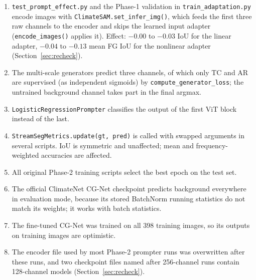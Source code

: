 \begin{enumerate}
  \item \texttt{test\_prompt\_effect.py} and the Phase-1 validation in \texttt{train\_adaptation.py} encode images with
  \texttt{ClimateSAM.set\_infer\_img()}, which feeds the first three raw channels to the encoder and skips the learned
  input adapter (\texttt{encode\_images()} applies it). Effect: $-0.00$ to $-0.03$ IoU for the linear adapter,
  $-0.04$ to $-0.13$ mean FG IoU for the nonlinear adapter (Section~\ref{sec:recheck}).
  \item The multi-scale generators predict three channels, of which only TC and AR are supervised (as independent
  sigmoids) by \texttt{compute\_\allowbreak generator\_\allowbreak loss}; the untrained background channel takes part in the final argmax.
  \item \texttt{LogisticRegressionPrompter} classifies the output of the first ViT block instead of the last.
  \item \texttt{StreamSegMetrics.\allowbreak update(gt, pred)} is called with swapped arguments in several scripts. IoU is
  symmetric and unaffected; mean and frequency-weighted accuracies are affected.
  \item All original Phase-2 training scripts select the best epoch on the test set.
  \item The official ClimateNet CG-Net checkpoint predicts background everywhere in evaluation mode, because its stored
  BatchNorm running statistics do not match its weights; it works with batch statistics.
  \item The fine-tuned CG-Net was trained on all 398 training images, so its outputs on training images are optimistic.
  \item The encoder file used by most Phase-2 prompter runs was overwritten after these runs, and two checkpoint files
  named after 256-channel runs contain 128-channel models (Section~\ref{sec:recheck}).
\end{enumerate}
